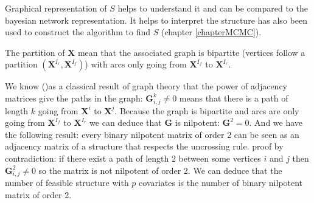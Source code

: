 \documentclass[12pt,a4paper]{report}
\begin{document}
	Graphical representation of $S$ helps to understand it and can be compared to the bayesian network representation. It helps to interpret the structure has also been used to construct the algorithm to find $S$ (chapter \ref{chapterMCMC}).


	
	The partition of $\boldsymbol{X}$ mean that the associated graph is bipartite (vertices follow a partition $(\boldsymbol{X}^{I_r},\boldsymbol{X}^{I_f})$) with arcs only going from $\boldsymbol{X}^{I_f}$ to $\boldsymbol{X}^{I_r}$.
	
	We know (\cite{biggs1993algebraic})as a classical result of graph theory that the power of adjacency matrices give the paths in the graph: $\boldsymbol{G}^k_{i,j}\neq 0$ means that there is a path of length $k$ going from $\boldsymbol{X}^i$ to $\boldsymbol{X}^j$. Because the graph is bipartite and arcs are only going from $\boldsymbol{X}^{I_f}$ to $\boldsymbol{X}^{I_r}$ we can deduce that $\boldsymbol{G}$ is nilpotent: $\boldsymbol{G}^2=0$. And we have the following result: every binary nilpotent matrix of order 2 can be seen as an adjacency matrix of a structure that respects the uncrossing rule. proof by contradiction: if there exist a path of length 2 between some vertices $i$ and $j$ then $\boldsymbol{G}^2_{i,j}\neq 0$ so the matrix is not nilpotent of order 2. We can deduce that the number of feasible structure with $p$ covariates is the number of binary nilpotent matrix of order 2.
	
\end{document}
